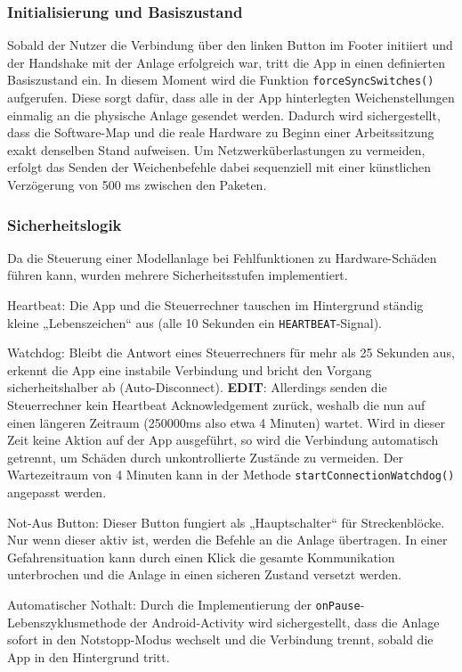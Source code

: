 \documentclass{article}
\begin{document}
\subsubsection{Initialisierung und Basiszustand}
Sobald der Nutzer die Verbindung über den linken Button im Footer initiiert und der Handshake mit der Anlage erfolgreich war, tritt die App in einen definierten Basiszustand ein.
In diesem Moment wird die Funktion \texttt{forceSyncSwitches()} aufgerufen.
Diese sorgt dafür, dass alle in der App hinterlegten Weichenstellungen einmalig an die physische Anlage gesendet werden.
Dadurch wird sichergestellt, dass die Software-Map und die reale Hardware zu Beginn einer Arbeitssitzung exakt denselben Stand aufweisen.
Um Netzwerküberlastungen zu vermeiden, erfolgt das Senden der Weichenbefehle dabei sequenziell mit einer künstlichen Verzögerung von 500 ms zwischen den Paketen.


\subsubsection{Sicherheitslogik}
Da die Steuerung einer Modellanlage bei Fehlfunktionen zu Hardware-Schäden führen kann, wurden mehrere Sicherheitsstufen implementiert.

Heartbeat: Die App und die Steuerrechner tauschen im Hintergrund ständig kleine „Lebenszeichen“ aus (alle 10 Sekunden ein \texttt{HEARTBEAT}-Signal).

Watchdog: Bleibt die Antwort eines Steuerrechners für mehr als 25 Sekunden aus, erkennt die App eine instabile Verbindung und bricht den Vorgang sicherheitshalber ab (Auto-Disconnect).
\textbf{EDIT}: Allerdings senden die Steuerrechner kein Heartbeat Acknowledgement zurück, weshalb die nun auf einen längeren Zeitraum (250000ms also etwa 4 Minuten) wartet.
Wird in dieser Zeit keine Aktion auf der App ausgeführt, so wird die Verbindung automatisch getrennt, um Schäden durch unkontrollierte Zustände zu vermeiden.
Der Wartezeitraum von 4 Minuten kann in der Methode \texttt{startConnectionWatchdog()} angepasst werden.

Not-Aus Button: Dieser Button fungiert als „Hauptschalter“ für Streckenblöcke.
Nur wenn dieser aktiv ist, werden die Befehle an die Anlage übertragen.
In einer Gefahrensituation kann durch einen Klick die gesamte Kommunikation unterbrochen und die Anlage in einen sicheren Zustand versetzt werden.

Automatischer Nothalt:
Durch die Implementierung der \texttt{onPause}-Lebenszyklusmethode der Android-Activity wird sichergestellt, dass die Anlage sofort in den Notstopp-Modus wechselt und die Verbindung trennt, sobald die App in den Hintergrund tritt.
\end{document}
